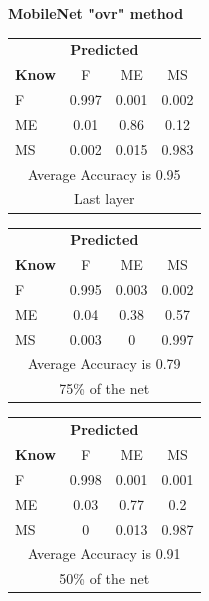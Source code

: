 \documentclass[12pt]{article} %
\begin{document}
\begin{center}
\textbf{ MobileNet "ovr" method}
\end{center}
\begin{minipage}{0.5\textwidth}
\begin{center}
\begin{tabular}{l|c|c|c|}
 \multicolumn{4}{c}{ \textbf{ Predicted}}\\
 \textbf{Know}&F&ME&MS\\ \hline\hline
F   &0.997&0.001&0.002\\
ME &0.01&0.86&0.12\\
MS &0.002&0.015&0.983\\
\multicolumn{4}{c}{Average Accuracy is 0.95}\\
\multicolumn{4}{c}{Last layer}\\
\end{tabular}
\end{center}
\end{minipage}
\begin{minipage}{0.5\textwidth}
\begin{center}
\begin{tabular}{l|c|c|c|}
 \multicolumn{4}{c}{ \textbf{ Predicted}}\\
 \textbf{Know}&F&ME&MS\\ \hline\hline
F    &0.995&0.003&0.002\\
ME &0.04&0.38&0.57\\
MS &0.003&0&0.997\\
\multicolumn{4}{c}{Average Accuracy is 0.79}\\
\multicolumn{4}{c}{75\%  of the net}\\
\end{tabular}
\end{center}
\end{minipage}
\begin{minipage}{0.5\textwidth}
\begin{center}
\begin{tabular}{l|c|c|c|}
 \multicolumn{4}{c}{ \textbf{ Predicted}}\\
 \textbf{Know}&F&ME&MS\\ \hline\hline
F   &0.998&0.001&0.001\\
ME &0.03&0.77&0.2\\
MS &0&0.013&0.987\\
\multicolumn{4}{c}{Average Accuracy is 0.91}\\
\multicolumn{4}{c}{50\%  of the net}\\
\end{tabular}
\end{center}
\end{minipage}
\end{document}
